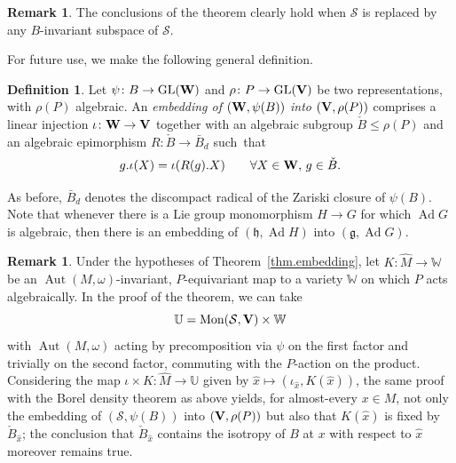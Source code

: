 \documentclass[pdftex]{sigma}
\numberwithin{equation}{section}
\theoremstyle{definition}
\newtheorem{defin}[thm]{Definition}
\newtheorem{rem}[thm]{Remark}
\def\V{{\bf V}}
\def\W{{\bf W}}
\newcommand{\cS}{{\mathcal S}}
\newcommand{\lieh}{\mathfrak{h}}
\def\g{{\mathfrak g}}
\newcommand{\Aut}{\operatorname{Aut}}
\newcommand{\Ad}{\operatorname{Ad}}
\newcommand{\GL}{{\operatorname{GL}}}
\begin{document}
\begin{rem}
The conclusions of the theorem clearly hold when $\mathcal{S}$ is replaced by any $B$-invariant subspace of $\mathcal{S}$.
\end{rem}

For future use, we make the following general definition.

\begin{defin}
\label{def.rep.embedding}
Let $\psi\colon B \rightarrow \GL({\W})$ and $\rho \colon P \rightarrow \GL({\V})$ be two representations, with $\rho(P)$ algebraic. An \emph{embedding of $({\W}, \psi(B))$ into $({\V}, \rho(P))$} comprises a linear injection $\iota\colon {\W} \rightarrow {\V}$ together with an algebraic subgroup $\check{B} \leq \rho(P)$ and an algebraic epimorphism $R\colon \check{B} \rightarrow \bar{B}_d$ such~that
\[ g. \iota(X) = \iota( R(g).X) \qquad \forall X \in {\bf W}, \, g \in \check{B}.\]
\end{defin}

As before, $\bar{B}_d$ denotes the discompact radical of the Zariski closure of $\psi(B)$.
Note that whenever there is a Lie group monomorphism $H \rightarrow G$ for which $\Ad G$ is algebraic, then there is an embedding of $(\lieh, \Ad H)$ into $(\g, \Ad G)$.

\begin{rem}
Under the hypotheses of Theorem~\ref{thm.embedding}, let
$K \colon \hat{M} \rightarrow \mathbb{W}$ be an $\Aut(M,\omega)$-invariant, $P$-equivariant map to a variety $\mathbb{W}$ on
 which $P$ acts algebraically.
 In the proof of the theorem, we can take
\[\mathbb{U} =\textrm{Mon}(\cS, \V)\times \mathbb{W}\]
with $\Aut(M,\omega)$ acting by precomposition via $\psi$ on the first factor and trivially on the second factor, commuting with the $P$-action on the product.
Considering the map $\iota \times K \colon \hat{M}\rightarrow \mathbb{U}$ given
by $\hat{x} \mapsto (\iota_{\hat{x}}, K(\hat{x}))$, the same proof with the Borel density theorem as above yields, for almost-every $x \in M$, not only the embedding of $(\mathcal{S}, \psi(B))$ into $({\bf V}, \rho(P))$ but also that $K(\hat{x})$ is fixed by $\check{B}_{\hat{x}}$; the conclusion that $\check{B}_{\hat{x}}$ contains the isotropy of $B$ at $x$ with respect to $\hat{x}$ moreover remains true.
\end{rem}
\end{document}
